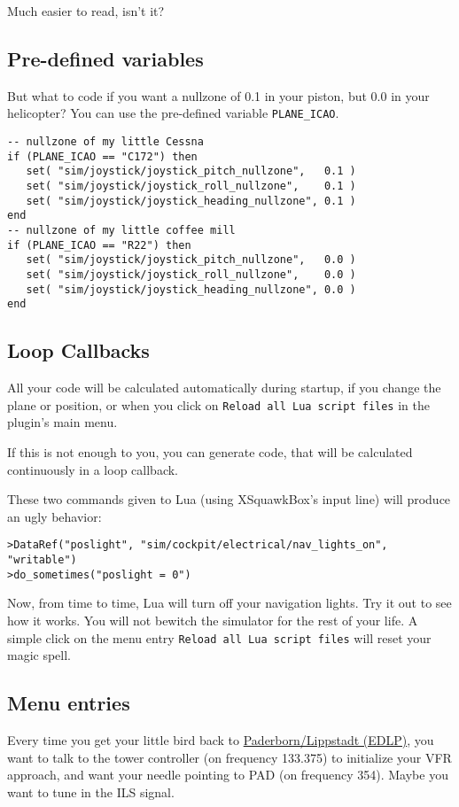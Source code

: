 \documentclass[11pt,parskip=half,a4paper]{scrartcl}
\begin{document}
Much easier to read, isn't it?

\subsection{Pre-defined variables}

But what to code if you want a nullzone of 0.1 in your piston, but 0.0 in your helicopter? You can use the pre-defined variable \verb|PLANE_ICAO|.

\begin{lstlisting}
-- nullzone of my little Cessna
if (PLANE_ICAO == "C172") then
   set( "sim/joystick/joystick_pitch_nullzone",   0.1 )
   set( "sim/joystick/joystick_roll_nullzone",    0.1 )
   set( "sim/joystick/joystick_heading_nullzone", 0.1 )
end
-- nullzone of my little coffee mill
if (PLANE_ICAO == "R22") then
   set( "sim/joystick/joystick_pitch_nullzone",   0.0 )
   set( "sim/joystick/joystick_roll_nullzone",    0.0 )
   set( "sim/joystick/joystick_heading_nullzone", 0.0 )
end
\end{lstlisting}

\subsection{Loop Callbacks}

All your code will be calculated automatically during startup, if you change the plane or position, or when you click on \verb|Reload all Lua script files| in the plugin's main menu.

If this is not enough to you, you can generate code, that will be calculated continuously in a loop callback.

These two commands given to Lua (using XSquawkBox's input line) will produce an ugly behavior:

\verb|>DataRef("poslight", "sim/cockpit/electrical/nav_lights_on", "writable")|\\
\verb|>do_sometimes("poslight = 0")|

Now, from time to time, Lua will turn off your navigation lights. Try it out to see how it works. You will not bewitch the simulator for the rest of your life. A simple click on the menu entry \verb|Reload all Lua script files| will reset your magic spell.

\subsection{Menu entries}

Every time you get your little bird back to \href{http://nav.vatsim-germany.org/files/edgg/charts/edlp/public/EDLP_ILS24.pdf}{Paderborn/Lippstadt (EDLP)}, you want to talk to the tower controller (on frequency 133.375) to initialize your VFR approach, and want your needle pointing to PAD (on frequency 354). Maybe you want to tune in the ILS signal.
\end{document}
